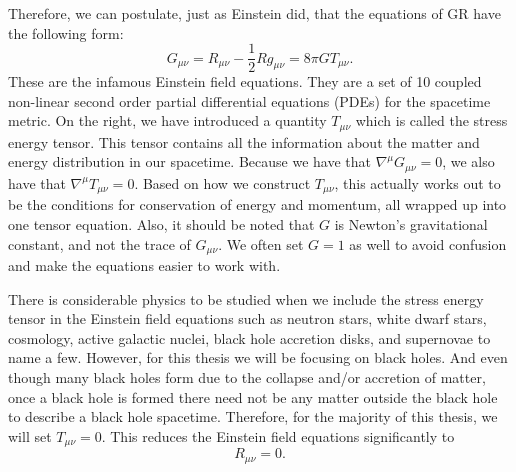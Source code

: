 \begin{bibunit}[unsrtnat]
Therefore, we can postulate, just as Einstein did, that the equations of GR have
the following form:
\begin{equation}
   G_{\mu\nu} = R_{\mu\nu} - \frac{1}{2}Rg_{\mu\nu} = 8\pi G T_{\mu\nu}.
\end{equation}
These are the infamous Einstein field equations. They are a set of 10 coupled
non-linear second order partial differential equations (PDEs) for the spacetime
metric. On the right, we have introduced a quantity $T_{\mu\nu}$ which is called
the stress energy tensor. This tensor contains all the information about the
matter and energy distribution in our spacetime. Because we have that
$\nabla^\mu G_{\mu\nu} = 0$, we also have that $\nabla^\mu T_{\mu\nu} = 0$.
Based on how we construct $T_{\mu\nu}$, this actually works out to be the
conditions for conservation of energy and momentum, all wrapped up into one
tensor equation. Also, it should be noted that $G$ is Newton's gravitational
constant, and not the trace of $G_{\mu\nu}$. We often set $G=1$ as well to avoid
confusion and make the equations easier to work with.

There is considerable physics to be studied when we include the stress energy
tensor in the Einstein field equations such as neutron stars, white dwarf
stars, cosmology, active galactic nuclei, black hole accretion disks, and
supernovae to name a few. However, for this thesis we will be focusing on
black holes. And even though many black holes form due to the collapse and/or
accretion of matter, once a black hole is formed there need not be any matter
outside the black hole to describe a black hole spacetime. Therefore, for the
majority of this thesis, we will set $T_{\mu\nu} = 0$. This reduces the Einstein
field equations significantly to
\begin{equation}
   R_{\mu\nu} = 0.
\end{equation}


\end{bibunit}
